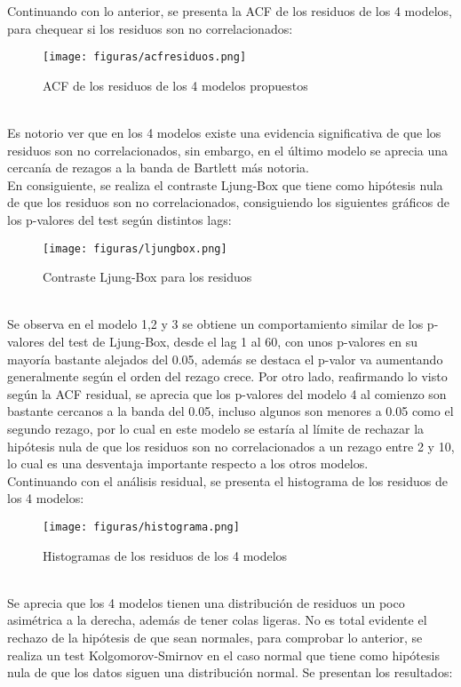 \documentclass{report}
\begin{document}
Continuando con lo anterior, se presenta la ACF de los residuos de los 4 modelos, para chequear si los residuos son no correlacionados:\\
\vspace{5cm}

\begin{figure}[htp]
    	\texttt{[image: figuras/acfresiduos.png]}
    	\caption{ACF de los residuos de los 4 modelos propuestos}
    	\label{fig: Figura1}
\end{figure}\\

Es notorio ver que en los 4 modelos existe una evidencia significativa de que los residuos son no correlacionados, sin embargo, en el último modelo se aprecia una cercanía de rezagos a la banda de Bartlett más notoria.\\

En consiguiente, se realiza el contraste Ljung-Box que tiene como hipótesis nula de que los residuos son no correlacionados, consiguiendo los siguientes gráficos de los p-valores del test según distintos lags:\\
\begin{figure}[htp]
        \centering
    	\texttt{[image: figuras/ljungbox.png]}
    	\caption{Contraste Ljung-Box para los residuos}
    	\label{fig: Figura1}
\end{figure}\\

Se observa en el modelo 1,2 y 3 se obtiene un comportamiento similar de los p-valores del test de Ljung-Box, desde el lag 1 al 60, con unos p-valores en su mayoría bastante alejados del 0.05, además se destaca el p-valor va aumentando generalmente según el orden del rezago crece. Por otro lado, reafirmando lo visto según la ACF residual, se aprecia que los p-valores del modelo 4 al comienzo son bastante cercanos a la banda del 0.05, incluso algunos son menores a 0.05 como el segundo rezago, por lo cual en este modelo se estaría al límite de rechazar la hipótesis nula de que los residuos son no correlacionados a un rezago entre 2 y 10, lo cual es una desventaja importante respecto a los otros modelos.\\

Continuando con el análisis residual, se presenta el histograma de los residuos de los 4 modelos:\\
\begin{figure}[htp]
        \centering
    	\texttt{[image: figuras/histograma.png]}
    	\caption{Histogramas de los residuos de los 4 modelos}
    	\label{fig: Figura1}
\end{figure}\\
Se aprecia que los 4 modelos tienen una distribución de residuos un poco asimétrica a la derecha, además de tener colas ligeras. No es total evidente el rechazo de la hipótesis de que sean normales, para comprobar lo anterior, se realiza un test Kolgomorov-Smirnov en el caso normal que tiene como hipótesis nula de que los datos siguen una distribución normal. Se presentan los resultados:\\
\end{document}
